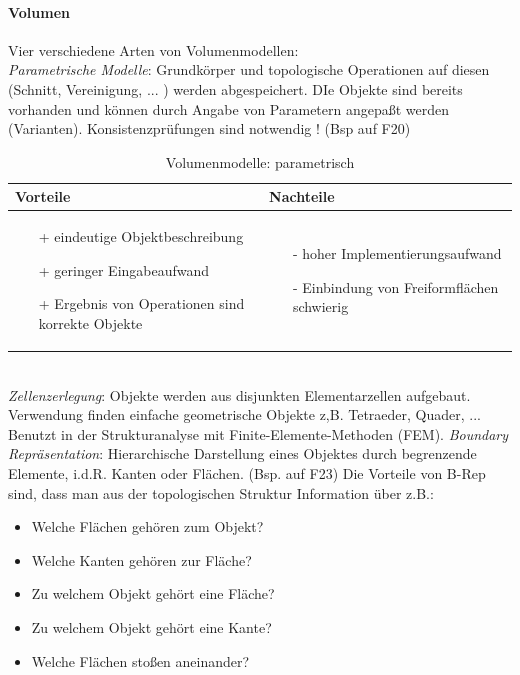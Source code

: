 \paragraph*{Volumen} Vier verschiedene Arten von Volumenmodellen:\\
\textit{Parametrische Modelle}: Grundkörper und topologische Operationen auf diesen (Schnitt, Vereinigung, ... ) werden abgespeichert. DIe Objekte sind bereits vorhanden und können durch Angabe von Parametern angepaßt werden (Varianten). Konsistenzprüfungen sind notwendig ! (Bsp auf F20)
\begin{table}[hbt]
\centering
\begin{tabular}{|p{6.5cm}|p{6.5cm}|}
\hline
Vorteile & Nachteile\\
\hline
\vspace{-5mm}
\begin{itemize}
\setlength\itemsep{0em}
\item[+] eindeutige Objektbeschreibung 
\item[+] geringer Eingabeaufwand 
\item[+] Ergebnis von Operationen sind korrekte Objekte
\end{itemize}
 &
 \vspace{-5mm}
\begin{itemize}
\setlength\itemsep{0em}
\item[-] hoher Implementierungsaufwand
\item[-] Einbindung von Freiformflächen schwierig
\end{itemize}\\
\hline
\end{tabular}
\caption{Volumenmodelle: parametrisch}
\label{tab:Volmod}
\end{table}\\ 
\textit{Zellenzerlegung}: Objekte werden aus disjunkten Elementarzellen aufgebaut. Verwendung finden einfache geometrische Objekte z,B. Tetraeder, Quader, ...
Benutzt in der Strukturanalyse mit Finite-Elemente-Methoden (FEM).
\textit{Boundary Repräsentation}: Hierarchische Darstellung eines Objektes durch begrenzende
Elemente, i.d.R. Kanten oder Flächen. (Bsp. auf F23)
Die Vorteile von B-Rep sind, dass man aus der topologischen Struktur Information über z.B.:
\begin{itemize}
\item Welche Flächen gehören zum Objekt?
\item Welche Kanten gehören zur Fläche?
\item Zu welchem Objekt gehört eine Fläche?
\item Zu welchem Objekt gehört eine Kante?
\item Welche Flächen stoßen aneinander?
\end{itemize}
